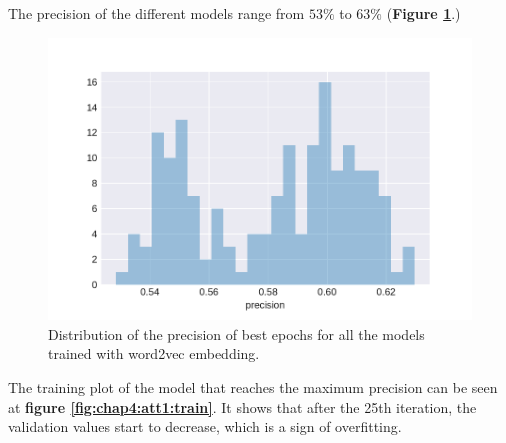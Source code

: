 The precision of the different models range from $53\%$ to $63\%$ (\textbf{Figure \ref{fig:chap4:att1:distPrecision}}.)
\begin{figure}
 \centering
 \includegraphics[width=\textwidth]{images/chapitre4/distplot_precision_liar_attention_word2vec}
 \caption{Distribution of the precision of best epochs for all the models trained with word2vec embedding.}
 \label{fig:chap4:att1:distPrecision}
\end{figure}
The training plot of the model that reaches the maximum precision can be seen at \textbf{figure \ref{fig:chap4:att1:train}}. It shows that after the 25th iteration, the validation values start to decrease, which is a sign of overfitting. \\

